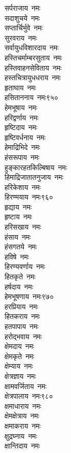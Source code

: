 \begin{multicols}{\maxColumns}
\begin{flushleft}
सर्पराजाय~नमः\\
सदाशुचये~नमः\\
सप्तार्चिर्भुवे~नमः\\
सुरवराय~नमः\\
सर्वायुधविशारदाय~नमः\\
हस्तिचर्माम्बरसुताय~नमः\\
हस्तिवाहनसेविताय~नमः\\
हस्तचित्रायुधधराय~नमः\\
हृताघाय~नमः\\
हसिताननाय~नमः\hfill ९५०\\
हेमभूषाय~नमः\\
हरिद्वर्णाय~नमः\\
हृष्टिदाय~नमः\\
हृष्टिवर्धनाय~नमः\\
हेमाद्रिभिदे~नमः\\
हंसरूपाय~नमः\\
हुङ्कारहतकिल्बिषाय~नमः\\
हिमाद्रिजातातनुजाय~नमः\\
हरिकेशाय~नमः\\
हिरण्मयाय~नमः\hfill ९६०\\
हृद्याय~नमः\\
हृष्टाय~नमः\\
हरिसखाय~नमः\\
हंसाय~नमः\\
हंसगतये~नमः\\
हविषे~नमः\\
हिरण्यवर्णाय~नमः\\
हितकृते~नमः\\
हर्षदाय~नमः\\
हेमभूषणाय~नमः\hfill ९७०\\
हरप्रियाय~नमः\\
हितकराय~नमः\\
हतपापाय~नमः\\
हरोद्भवाय~नमः\\
क्षेमदाय~नमः\\
क्षेमकृते~नमः\\
क्षेम्याय~नमः\\
क्षेत्रज्ञाय~नमः\\
क्षामवर्जिताय~नमः\\
क्षेत्रपालाय~नमः\hfill ९८०\\
क्षमाधाराय~नमः\\
क्षेमक्षेत्राय~नमः\\
क्षमाकराय~नमः\\
क्षुद्रघ्नाय~नमः\\
क्षान्तिदाय~नमः\\

\end{flushleft}
\end{multicols}
